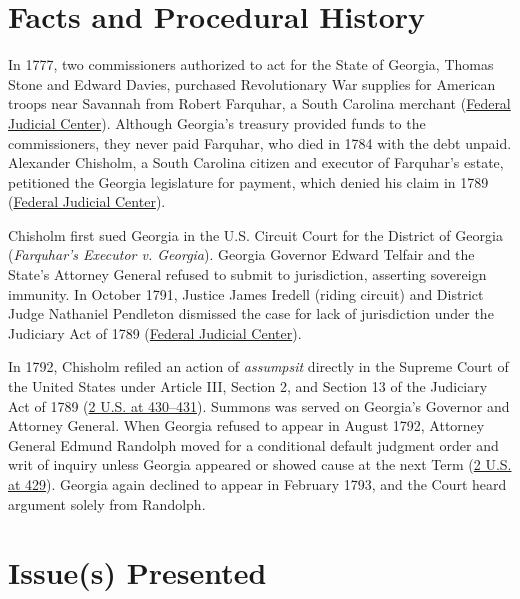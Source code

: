 \documentclass[12pt]{article}
\begin{document}
\section{Facts and Procedural History}

In 1777, two commissioners authorized to act for the State of Georgia, Thomas Stone and Edward Davies, purchased Revolutionary War supplies for American troops near Savannah from Robert Farquhar, a South Carolina merchant (\href{https://www.fjc.gov/history/cases/cases-that-shaped-the-federal-courts/chisholm-v-georgia}{Federal Judicial Center}). Although Georgia's treasury provided funds to the commissioners, they never paid Farquhar, who died in 1784 with the debt unpaid. Alexander Chisholm, a South Carolina citizen and executor of Farquhar's estate, petitioned the Georgia legislature for payment, which denied his claim in 1789 (\href{https://www.fjc.gov/history/cases/cases-that-shaped-the-federal-courts/chisholm-v-georgia}{Federal Judicial Center}).

Chisholm first sued Georgia in the U.S. Circuit Court for the District of Georgia (\emph{Farquhar's Executor v. Georgia}). Georgia Governor Edward Telfair and the State's Attorney General refused to submit to jurisdiction, asserting sovereign immunity. In October 1791, Justice James Iredell (riding circuit) and District Judge Nathaniel Pendleton dismissed the case for lack of jurisdiction under the Judiciary Act of 1789 (\href{https://www.fjc.gov/history/cases/cases-that-shaped-the-federal-courts/chisholm-v-georgia}{Federal Judicial Center}).

In 1792, Chisholm refiled an action of \emph{assumpsit} directly in the Supreme Court of the United States under Article III, Section 2, and Section 13 of the Judiciary Act of 1789 (\href{https://supreme.justia.com/cases/federal/us/2/419/}{2 U.S. at 430--431}). Summons was served on Georgia's Governor and Attorney General. When Georgia refused to appear in August 1792, Attorney General Edmund Randolph moved for a conditional default judgment order and writ of inquiry unless Georgia appeared or showed cause at the next Term (\href{https://supreme.justia.com/cases/federal/us/2/419/}{2 U.S. at 429}). Georgia again declined to appear in February 1793, and the Court heard argument solely from Randolph.

\section{Issue(s) Presented}
\end{document}
